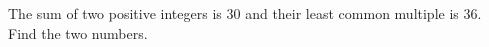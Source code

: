 The sum of two positive integers is $30$ and their least common multiple is $36$. Find the two numbers.
